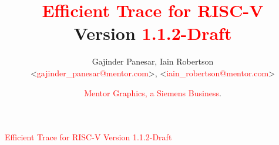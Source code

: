 \documentclass[twoside,11pt]{book}
\newcommand{\versionnum}{1.1.2-Draft}
\begin{document}
\setcounter{footnote}{0}

\title{\textcolor{red}{Efficient Trace for RISC-V}\\
Version \textcolor{red}{\versionnum}\\
\GITHash
}

\author{
  Gajinder Panesar, Iain Robertson \\
 \textless \textcolor{red}{gajinder\_panesar@mentor.com}\textgreater, \textless \textcolor{red}{iain\_robertson@mentor.com}\textgreater
 \and
 \textcolor{red}{Mentor Graphics, a Siemens Business}.
}


\maketitle

\markboth{\textcolor{red}{Efficient Trace for RISC-V Version} \textcolor{red}{\versionnum}}
{\textcolor{red}{Efficient Trace for RISC-V Version} \textcolor{red}{\versionnum}}
\thispagestyle{empty}

\frontmatter

\tableofcontents
\listoffigures
\listoftables

\mainmatter













\newpage
\end{document}
